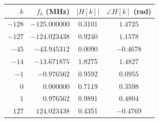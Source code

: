 \begin{tabular}{rrcc}
\toprule
$k$ & $f_k$ (MHz) & $|H[k]|$ & $\angle H[k]$ (rad) \\
\midrule
$-128$ & $-125.000000$ & 0.3101 & $1.4725$ \\
$-127$ & $-124.023438$ & 0.9240 & $1.1578$ \\
$-45$ & $-43.945312$ & 0.0090 & $-0.4678$ \\
$-14$ & $-13.671875$ & 1.8275 & $1.4827$ \\
$-1$ & $-0.976562$ & 0.9592 & $0.0955$ \\
$0$ & $0.000000$ & 0.7119 & $0.3598$ \\
$1$ & $0.976562$ & 0.9891 & $0.4804$ \\
$127$ & $124.023438$ & 0.4351 & $-0.4769$ \\
\bottomrule
\end{tabular}
